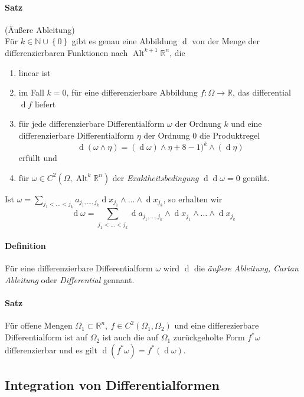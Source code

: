 \documentclass[12pt,a4paper,fleqn]{article}
\def\set#1{{\left\{ #1 \right\}}}
\def\R{{\mathbb{R}}}
\def\d{{\operatorname{d}}}
\begin{document}
\paragraph{Satz} (Äußere Ableitung)\\
Für $k\in \mathbb{N}\cup\set{0}$ gibt es genau eine Abbildung $\d$ von der Menge der differenzierbaren Funktionen nach $\operatorname{Alt}^{k+1} \R^n$, die
\begin{enumerate}
\item linear ist
\item im Fall $k=0$, für eine differenzierbare Abbildung $f\colon \Omega \rightarrow \R$, das differential $\d f$ liefert
\item für jede differenzierbare Differentialform $\omega$ der Ordnung $k$ und eine differenzierbare Differentialform $\eta$ der Ordnung $0$ die Produktregel
\begin{displaymath}
\d (\omega\wedge\eta) = (\d \omega) \wedge\eta + 8-1)^k\wedge(\d \eta)
\end{displaymath}
erfüllt und
\item für $\omega \in C^2(\Omega, \operatorname{Alt}^k \R^n)$ der \textit{Exaktheitsbedingung} $\d\d \omega = 0$ genüht.
\end{enumerate}
Ist $\omega = \sum_{j_1 <\dots < j_k} a_{j_1, \dots, j_k}\d x_{j_1}\wedge\dots\wedge\d x_{j_k}$, so erhalten wir 
\begin{displaymath}
\d\omega = \sum_{j_1 < \dots < j_k}\d a_{j_1, \dots, j_k} \wedge\d x_{j_1}\wedge\dots\wedge\d x_{j_k}
\end{displaymath}

\paragraph{Definition} Für eine differenzierbare Differentialform $\omega$ wird $\d$ die \textit{äußere Ableitung, Cartan Ableitung} oder \textit{Differential} gennant.

\paragraph{Satz} Für offene Mengen $\Omega_1\subset \R^n,\ f\in C^2(\Omega_1, \Omega_2)$ und eine differezierbare Differentialform ist auf $\Omega_2$ ist auch die auf $\Omega_1$ zurückgeholte Form $f^\ast\omega$ differenzierbar und es gilt $\d (f^\ast\omega)=f^\ast(\d \omega)$.

\subsection{Integration von Differentialformen}
\end{document}
